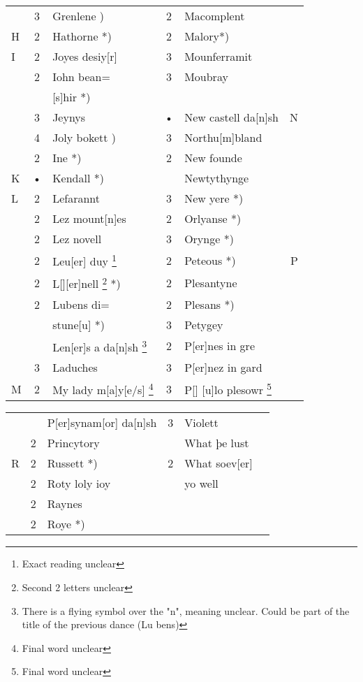 \documentclass[12pt,letter]{article} %
\begin{document}
\begin{center}
\begin{tabular}{lcl clr}
\end{tabular}
\newpage
\begin{tabular}{lcl clr}   %
  & 3 & Grenlene ) & 2 & Macomplent & \\
H & 2 & Hathorne *) & 2 & Malory*)  & \\
I & 2 & Joyes desiy[r] & 3 & Mounferramit & \\
  & 2 & Iohn bean= & 3 & Moubray & \\
  &   & [s]hir *) \\
  & 3 & Jeynys & • & New castell da[n]sh & N \\
  & 4 & Joly bokett ) & 3 & Northu[m]bland & \\
  & 2 & Ine *) & 2 & New founde & \\
K & • & Kendall *) & &  Newtythynge & \\
L & 2 & Lefarannt & 3 & New yere *) & \\
  & 2 & Lez mount[n]es & 2 & Orlyanse *) & \\
  & 2 & Lez novell & 3 & Orynge *) & \\
  & 2 & Leu[er] duy \footnote{Exact reading unclear} & 2 & Peteous *) & P \\
  & 2 & L[][er]nell \footnote{Second 2 letters unclear} *) & 2 & Plesantyne & \\
  & 2 & Lubens di= & 2 & Plesans *) & \\
  &   & stune[u] *) & 3 & Petygey & \\
  &   & Len[er]s a da[n]sh \footnote{There is a flying symbol over the "n", meaning unclear.  Could be part of the title of the previous dance (Lu bens)} & 2 & P[er]nes in gre & \\
  & 3 & Laduches & 3 & P[er]nez in gard & \\
M & 2 & My lady m[a]y[e/s] \footnote{Final word unclear} & 3 & P[] [u]lo plesowr \footnote{Final word unclear} & \\
\end{tabular}
\newpage
\begin{tabular}{lcl clr}   %
  &   & P[er]synam[or] da[n]sh & 3 & Violett & \\
  & 2 & Princytory &   & What þe lust & \\
R & 2 & Russett *) & 2 & What soev[er] & \\
  & 2 & Roty loly ioy &   & yo well & \\
  & 2 & Raynes & & & \\
  & 2 & Roye *) & & & \\

\end{tabular}
\end{center}
\end{document}
